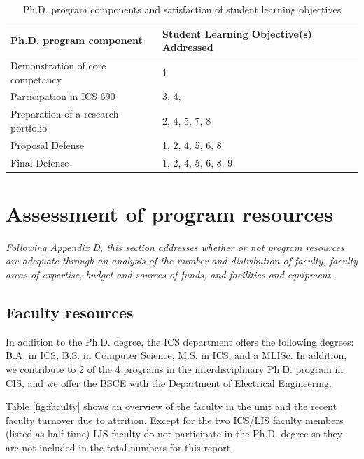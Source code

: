 \documentclass[12pt]{article}
\begin{document}
\begin{table}[htbp]
\begin{center}
\caption{Ph.D. program components and satisfaction of student learning
  objectives}
\label{phd.slos}
\begin{tabular}{|l|l|} \hline
{\bf Ph.D. program component} & {\bf Student Learning Objective(s) Addressed}  \\ \hline
Demonstration of core competancy & 1 \\
Participation in ICS 690 & 3, 4,  \\
Preparation of a research portfolio & 2, 4, 5, 7, 8 \\
Proposal Defense & 1, 2, 4, 5, 6, 8 \\
Final Defense & 1, 2, 4, 5, 6, 8, 9 \\ \hline
\end{tabular}
\end{center}
\end{table}

\section{Assessment of program resources}

{\em Following Appendix D, this section addresses whether or not program
  resources are adequate through an analysis of the number and distribution
  of faculty, faculty areas of expertise, budget and sources of funds, and
  facilities and equipment.}

\subsection{Faculty resources}

In addition to the Ph.D. degree, the ICS department offers the following
degrees: B.A. in ICS, B.S. in Computer Science, M.S. in
ICS, and a MLISc. In addition, we contribute to 2 of the 4 programs
in the interdisciplinary Ph.D. program in CIS, and we offer the BSCE with the
Department of Electrical Engineering.

Table \ref{fig:faculty} shows an overview of the faculty in the unit and
the recent faculty turnover due to attrition. Except for the two ICS/LIS
faculty members (listed as half time) LIS faculty do not participate in the
Ph.D. degree so they are not included in the total numbers for this
report. 
\end{document}
